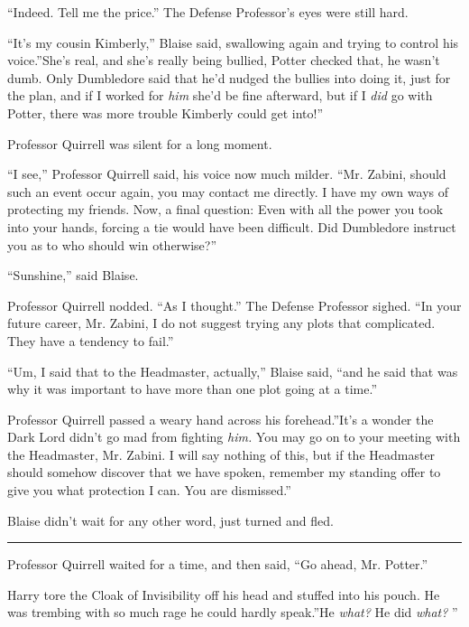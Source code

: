 ``Indeed. Tell me the price.'' The Defense Professor's eyes were still
hard.

``It's my cousin Kimberly,'' Blaise said, swallowing again and trying to
control his voice.''She's real, and she's really being bullied, Potter
checked that, he wasn't dumb. Only Dumbledore said that he'd nudged the
bullies into doing it, just for the plan, and if I worked for \emph{him}
she'd be fine afterward, but if I \emph{did} go with Potter, there was
more trouble Kimberly could get into!''

Professor Quirrell was silent for a long moment.

``I see,'' Professor Quirrell said, his voice now much milder. ``Mr.
Zabini, should such an event occur again, you may contact me directly. I
have my own ways of protecting my friends. Now, a final question: Even
with all the power you took into your hands, forcing a tie would have
been difficult. Did Dumbledore instruct you as to who should win
otherwise?''

``Sunshine,'' said Blaise.

Professor Quirrell nodded. ``As I thought.'' The Defense Professor
sighed. ``In your future career, Mr. Zabini, I do not suggest trying any
plots that complicated. They have a tendency to fail.''

``Um, I said that to the Headmaster, actually,'' Blaise said, ``and he
said that was why it was important to have more than one plot going at a
time.''

Professor Quirrell passed a weary hand across his forehead.''It's a
wonder the Dark Lord didn't go mad from fighting \emph{him.} You may go
on to your meeting with the Headmaster, Mr. Zabini. I will say nothing
of this, but if the Headmaster should somehow discover that we have
spoken, remember my standing offer to give you what protection I can.
You are dismissed.''

Blaise didn't wait for any other word, just turned and fled.

\begin{center}\rule{3in}{0.4pt}\end{center}

Professor Quirrell waited for a time, and then said, ``Go ahead, Mr.
Potter.''

Harry tore the Cloak of Invisibility off his head and stuffed into his
pouch. He was trembing with so much rage he could hardly speak.''He
\emph{what?} He did \emph{what?} ''

